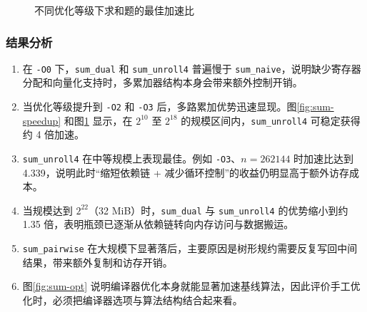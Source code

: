 \documentclass[a4paper]{article}
\begin{document}
\begin{figure}[H]
  \centering
  \caption{不同优化等级下求和题的最佳加速比}
  \label{fig:sum-best-opt}
\end{figure}

\subsubsection{结果分析}
\begin{enumerate}
  \item 在 \texttt{-O0} 下，\texttt{sum\_dual} 和 \texttt{sum\_unroll4} 普遍慢于 \texttt{sum\_naive}，说明缺少寄存器分配和向量化支持时，多累加器结构本身会带来额外控制开销。
  \item 当优化等级提升到 \texttt{-O2} 和 \texttt{-O3} 后，多路累加优势迅速显现。图\ref{fig:sum-speedup} 和图\ref{fig:sum-best-opt} 显示，在 $2^{10}$ 至 $2^{18}$ 的规模区间内，\texttt{sum\_unroll4} 可稳定获得约 4 倍加速。
  \item \texttt{sum\_unroll4} 在中等规模上表现最佳。例如 \texttt{-O3}、$n=262144$ 时加速比达到 4.339，说明此时“缩短依赖链 + 减少循环控制”的收益仍明显高于额外访存成本。
  \item 当规模达到 $2^{22}$（32 MiB）时，\texttt{sum\_dual} 与 \texttt{sum\_unroll4} 的优势缩小到约 1.35 倍，表明瓶颈已逐渐从依赖链转向内存访问与数据搬运。
  \item \texttt{sum\_pairwise} 在大规模下显著落后，主要原因是树形规约需要反复写回中间结果，带来额外复制和访存开销。
  \item 图\ref{fig:sum-opt} 说明编译器优化本身就能显著加速基线算法，因此评价手工优化时，必须把编译器选项与算法结构结合起来看。
\end{enumerate}
\end{document}
